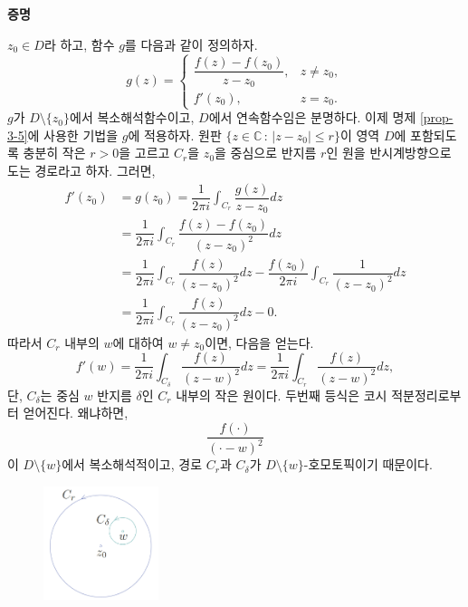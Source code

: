 {\bf 증명}

$z_0\in D$라 하고,
함수 $g$를 다음과 같이 정의하자.
\[
g(z) = \begin{cases}
\dfrac{f(z)-f(z_0)}{z-z_0}, & z\ne z_0, \\
f'(z_0), & z=z_0.
\end{cases}
\]
$g$가 $D\setminus \{z_0\}$에서 복소해석함수이고, 
$D$에서 연속함수임은 분명하다.
이제 명제 \ref{prop-3-5}에 사용한 기법을 $g$에 적용하자.
원판 $\{z\in\mathbb C\,:\, |z-z_0| \le r\}$이
영역 $D$에 포함되도록 충분히 작은 $r>0$을 고르고
$C_r$을 $z_0$을 중심으로 반지름 $r$인 원을 반시계방향으로 도는 경로라고 하자.
그러면,
\begin{align}
f'(z_0) &= g(z_0)
= \dfrac1{2\pi i} \int_{C_r} \dfrac{g(z)}{z - z_0} dz \nonumber \\
&= \dfrac1{2\pi i} \int_{C_r} \dfrac{f(z)-f(z_0)}{(z-z_0)^2} dz \\
&= \dfrac1{2\pi i} \int_{C_r} \dfrac{f(z)}{(z-z_0)^2} dz
- \dfrac{f(z_0)}{2\pi i} \int_{C_r} \dfrac{1}{(z-z_0)^2} dz \nonumber \\
&= \dfrac1{2\pi i} \int_{C_r} \dfrac{f(z)}{(z-z_0)^2} dz - 0. \label{eq-3-5}
\end{align}
따라서 $C_r$ 내부의 $w$에 대하여 $w\ne z_0$이면, 다음을 얻는다.
\[
f'(w) = \dfrac1{2\pi i}\int_{C_\delta} \dfrac{f(z)}{(z-w)^2}dz
= \dfrac1{2\pi i}\int_{C_r} \dfrac{f(z)}{(z-w)^2}dz,
\]
단, $C_\delta$는  중심 $w$ 반지름 $\delta$인 $C_r$ 내부의 작은 원이다. 
두번째 등식은 코시 적분정리로부터 얻어진다. 왜냐하면,
\[
\dfrac{f(\cdot)}{(\cdot - w)^2}
\]
이 $D\setminus \{w\}$에서 복소해석적이고, 경로 $C_r$과 $C_\delta$가
$D\setminus \{w\}$-호모토픽이기 때문이다.

\begin{figure}[h!]
\begin{center}
\includegraphics[width=0.3\textwidth]{./SaltChapter/figs/fig-3-0-11}
\end{center}
\end{figure}

